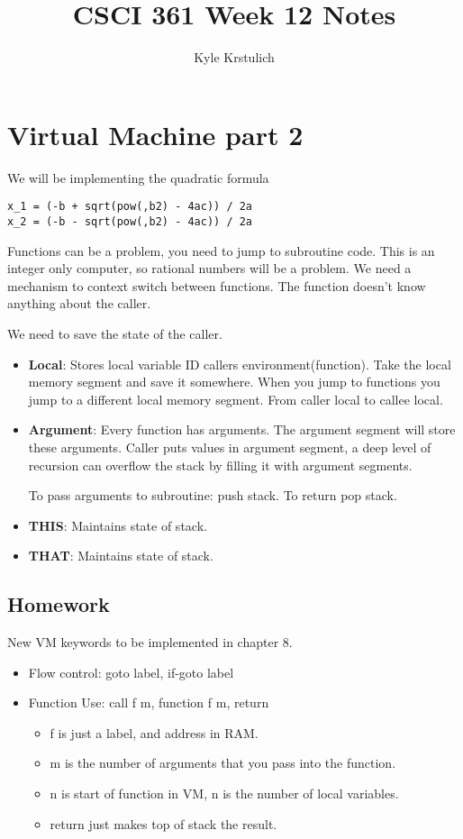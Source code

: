 \documentclass[12pt]{article}
\title{CSCI 361 Week 12 Notes}
\author{
  Kyle Krstulich
}
\begin{document}
\maketitle

\section*{Virtual Machine part 2}

We will be implementing the quadratic formula
\begin{verbatim}
x_1 = (-b + sqrt(pow(,b2) - 4ac)) / 2a
x_2 = (-b - sqrt(pow(,b2) - 4ac)) / 2a
\end{verbatim}

Functions can be a problem, you need to jump to subroutine code. This is an integer only computer,
so rational numbers will be a problem. We need a mechanism to context switch between functions. The
function doesn't know anything about the caller.

We need to save the state of the caller.
\begin{itemize}
  \item \textbf{Local}: Stores local variable ID callers environment(function). Take the local
    memory segment and save it somewhere. When you jump to functions you jump to a different local
    memory segment. From caller local to callee local. 

  \item \textbf{Argument}: Every function has arguments. The argument segment will store these
    arguments. Caller puts values in argument segment, a deep level of recursion can overflow the
    stack by filling it with argument segments.

    To pass arguments to subroutine: push stack. To return pop stack.

  \item \textbf{THIS}: Maintains state of stack.

  \item \textbf{THAT}: Maintains state of stack.
\end{itemize}

\subsection*{Homework}
New VM keywords to be implemented in chapter 8.
\begin{itemize}
  \item Flow control: goto label, if-goto label

  \item Function Use: call f m, function f m, return

    \begin{itemize}
      \item f is just a label, and address in RAM.
      \item m is the number of arguments that you pass into the function.
      \item n is start of function in VM, n is the number of local variables.
      \item return just makes top of stack the result.
    \end{itemize}
\end{itemize}
\end{document}
